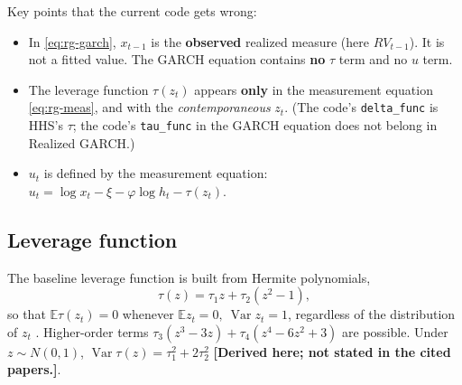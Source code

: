 \documentclass[11pt]{article}
\newcommand{\E}{\mathbb{E}}
\newcommand{\Var}{\operatorname{Var}}
\newcommand{\derived}{\textbf{[Derived here; not stated in the cited papers.]}}
\begin{document}
Key points that the current code gets wrong:
\begin{itemize}
\item In \eqref{eq:rg-garch}, $x_{t-1}$ is the \textbf{observed} realized measure (here
  $RV_{t-1}$). It is not a fitted value. The GARCH equation contains \textbf{no} $\tau$ term
  and no $u$ term.
\item The leverage function $\tau(z_t)$ appears \textbf{only} in the measurement equation
  \eqref{eq:rg-meas}, and with the \emph{contemporaneous} $z_t$. (The code's
  \texttt{delta\_func} is HHS's $\tau$; the code's \texttt{tau\_func} in the GARCH equation
  does not belong in Realized GARCH.)
\item $u_t$ is defined by the measurement equation: $u_t=\log x_t-\xi-\varphi\log
  h_t-\tau(z_t)$.
\end{itemize}

\subsection{Leverage function}
The baseline leverage function is built from Hermite polynomials,
\begin{equation}\label{eq:tau}
\tau(z) = \tau_1 z + \tau_2 (z^2-1),
\end{equation}
so that $\E\tau(z_t)=0$ whenever $\E z_t=0,\ \Var z_t=1$, regardless of the distribution
of $z_t$ \cite{HHS2012}. Higher-order terms $\tau_3(z^3-3z)+\tau_4(z^4-6z^2+3)$ are possible.
Under $z\sim N(0,1)$, $\Var\tau(z)=\tau_1^2+2\tau_2^2$ \derived.
\end{document}
